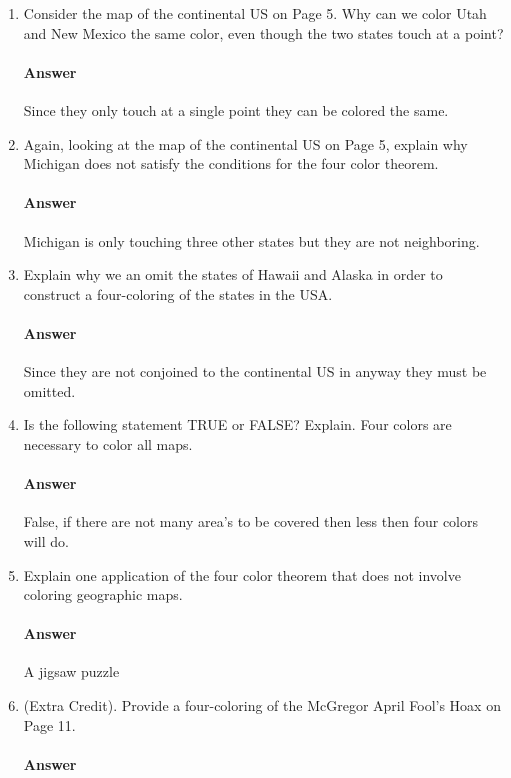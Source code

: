 \documentclass{article}
\begin{document}
\begin{enumerate}

    \item Consider the map of the continental US on Page 5.  Why can we color
        Utah and New Mexico the same color, even though the two states touch at
        a point?

        \paragraph{Answer}
        Since they only touch at a single point they can be colored the same.

    \item Again, looking at the map of the continental US on Page 5, explain why
        Michigan does not satisfy the conditions for the four color theorem.

        \paragraph{Answer}
        Michigan is only touching three other states but they are not neighboring.

    \item Explain why we an omit the states of Hawaii and Alaska in order to
        construct a four-coloring of the states in the USA.

        \paragraph{Answer}
        Since they are not conjoined to the continental US in anyway they must be omitted.

    \item Is the following statement TRUE or FALSE?  Explain. Four colors are
        necessary to color all maps.

        \paragraph{Answer}
        False, if there are not many area's to be covered then less then four colors will do.

    \item Explain one application of the four color theorem that does not
        involve coloring geographic maps.

        \paragraph{Answer}
        A jigsaw puzzle
    \item (Extra Credit). Provide a four-coloring of the McGregor April Fool's
        Hoax on Page 11.

        \paragraph{Answer}

\end{enumerate}
\end{document}
